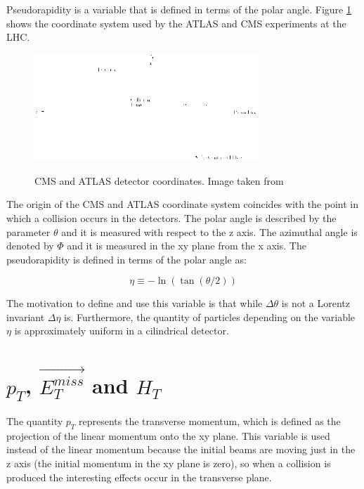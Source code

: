 Pseudorapidity is a variable that is defined in terms of the polar angle. Figure \ref{CMSCoordinates} shows the coordinate system used by the ATLAS and CMS experiments at the LHC.
 
 \begin{figure}[h]
 \centering
 \caption{CMS and ATLAS detector coordinates. Image taken from \cite{CMS_ATLAS_coordinates}}
 \includegraphics[width=0.75\textwidth]{./Capitulos/VariableDefinitions/CMS_coordinates}  
 \label{CMSCoordinates}
 \end{figure}

The origin of the CMS and ATLAS coordinate system coincides with the point in which a collision occurs in the detectors. The polar angle is described by the parameter $\theta$ and it is measured with respect to the z axis. The azimuthal angle is denoted by $\Phi$ and it is measured in the xy plane from the x axis. The pseudorapidity is defined in terms of the polar angle as:

\begin{equation}
 \eta \equiv - \ln \left( \tan (\theta /2 ) \right)
\end{equation}

 The motivation to define and use this variable is that while $\Delta \theta$ is not a Lorentz invariant $\Delta \eta$ is. Furthermore, the quantity of particles depending on the variable $\eta$
 is approximately uniform in a cilindrical detector. 
 
  
 \section{$p_T$, $\vec{E_T^{miss}}$ and $H_T$}

 The quantity $p_T$ represents the transverse momentum, which is defined as the projection of the linear momentum onto the xy plane. This variable is used instead of the linear momentum because the initial beams are moving just in the z axis (the initial momentum in the xy plane is zero), so when a collision is produced the interesting effects occur in the transverse plane.
 
